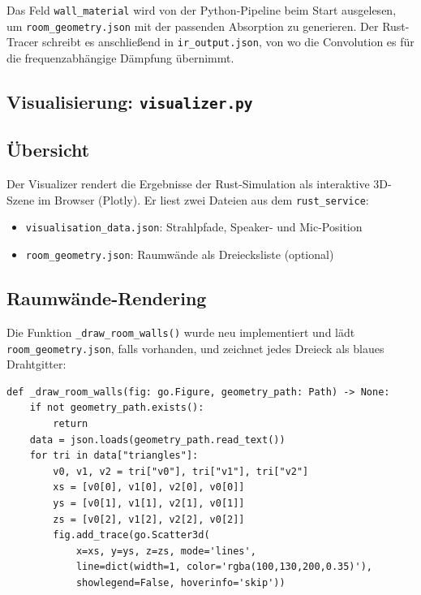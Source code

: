 Das Feld \texttt{wall\_material} wird von der Python-Pipeline beim
Start ausgelesen, um \texttt{room\_geometry.json} mit der passenden Absorption
zu generieren. Der Rust-Tracer schreibt es anschlie\ss{}end in \texttt{ir\_output.json},
von wo die Convolution es f\"ur die frequenzabh\"angige D\"ampfung \"ubernimmt.



\subsection{Visualisierung: \texttt{visualizer.py}}

\subsection{\"Ubersicht}

Der Visualizer rendert die Ergebnisse der Rust-Simulation als interaktive
3D-Szene im Browser (Plotly). Er liest zwei Dateien aus dem \texttt{rust\_service}:

\begin{itemize}
    \item \texttt{visualisation\_data.json}: Strahlpfade, Speaker- und Mic-Position
    \item \texttt{room\_geometry.json}: Raumw\"ande als Dreiecksliste (optional)
\end{itemize}

\subsection{Raumwände-Rendering}

Die Funktion \texttt{\_draw\_room\_walls()} wurde neu implementiert und l\"adt
\texttt{room\_geometry.json}, falls vorhanden, und zeichnet jedes Dreieck als
blaues Drahtgitter:

\begin{lstlisting}
def _draw_room_walls(fig: go.Figure, geometry_path: Path) -> None:
    if not geometry_path.exists():
        return
    data = json.loads(geometry_path.read_text())
    for tri in data["triangles"]:
        v0, v1, v2 = tri["v0"], tri["v1"], tri["v2"]
        xs = [v0[0], v1[0], v2[0], v0[0]]
        ys = [v0[1], v1[1], v2[1], v0[1]]
        zs = [v0[2], v1[2], v2[2], v0[2]]
        fig.add_trace(go.Scatter3d(
            x=xs, y=ys, z=zs, mode='lines',
            line=dict(width=1, color='rgba(100,130,200,0.35)'),
            showlegend=False, hoverinfo='skip'))
\end{lstlisting}

